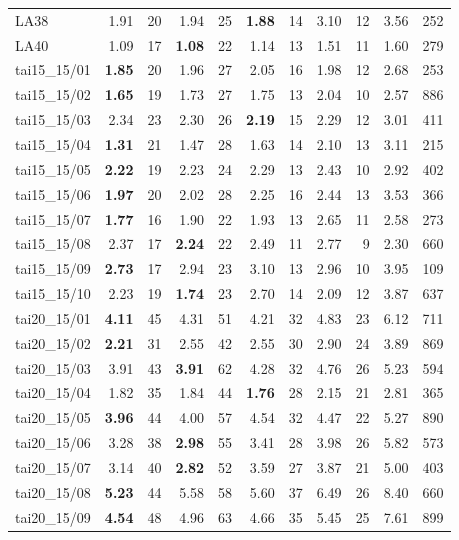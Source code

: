 \begin{longtable}{l | rr | rr | rr | rr | rr}
LA38           & 1.91 & 20 & 1.94 & 25 & \textbf{1.88} & 14 & 3.10 & 12 & 3.56 & 252 \\
LA40           & 1.09 & 17 & \textbf{1.08} & 22 & 1.14 & 13 & 1.51 & 11 & 1.60 & 279 \\
\hline
tai15_15/01    & \textbf{1.85} & 20 & 1.96 & 27 & 2.05 & 16 & 1.98 & 12 & 2.68 & 253 \\
tai15_15/02    & \textbf{1.65} & 19 & 1.73 & 27 & 1.75 & 13 & 2.04 & 10 & 2.57 & 886 \\
tai15_15/03    & 2.34 & 23 & 2.30 & 26 & \textbf{2.19} & 15 & 2.29 & 12 & 3.01 & 411 \\
tai15_15/04    & \textbf{1.31} & 21 & 1.47 & 28 & 1.63 & 14 & 2.10 & 13 & 3.11 & 215 \\
tai15_15/05    & \textbf{2.22} & 19 & 2.23 & 24 & 2.29 & 13 & 2.43 & 10 & 2.92 & 402 \\
tai15_15/06    & \textbf{1.97} & 20 & 2.02 & 28 & 2.25 & 16 & 2.44 & 13 & 3.53 & 366 \\
tai15_15/07    & \textbf{1.77} & 16 & 1.90 & 22 & 1.93 & 13 & 2.65 & 11 & 2.58 & 273 \\
tai15_15/08    & 2.37 & 17 & \textbf{2.24} & 22 & 2.49 & 11 & 2.77 & 9 & 2.30 & 660 \\
tai15_15/09    & \textbf{2.73} & 17 & 2.94 & 23 & 3.10 & 13 & 2.96 & 10 & 3.95 & 109 \\
tai15_15/10    & 2.23 & 19 & \textbf{1.74} & 23 & 2.70 & 14 & 2.09 & 12 & 3.87 & 637 \\
\hline
tai20_15/01    & \textbf{4.11} & 45 & 4.31 & 51 & 4.21 & 32 & 4.83 & 23 & 6.12 & 711 \\
tai20_15/02    & \textbf{2.21} & 31 & 2.55 & 42 & 2.55 & 30 & 2.90 & 24 & 3.89 & 869 \\
tai20_15/03    & 3.91 & 43 & \textbf{3.91} & 62 & 4.28 & 32 & 4.76 & 26 & 5.23 & 594 \\
tai20_15/04    & 1.82 & 35 & 1.84 & 44 & \textbf{1.76} & 28 & 2.15 & 21 & 2.81 & 365 \\
tai20_15/05    & \textbf{3.96} & 44 & 4.00 & 57 & 4.54 & 32 & 4.47 & 22 & 5.27 & 890 \\
tai20_15/06    & 3.28 & 38 & \textbf{2.98} & 55 & 3.41 & 28 & 3.98 & 26 & 5.82 & 573 \\
tai20_15/07    & 3.14 & 40 & \textbf{2.82} & 52 & 3.59 & 27 & 3.87 & 21 & 5.00 & 403 \\
tai20_15/08    & \textbf{5.23} & 44 & 5.58 & 58 & 5.60 & 37 & 6.49 & 26 & 8.40 & 660 \\
tai20_15/09    & \textbf{4.54} & 48 & 4.96 & 63 & 4.66 & 35 & 5.45 & 25 & 7.61 & 899 \\

\end{longtable}
